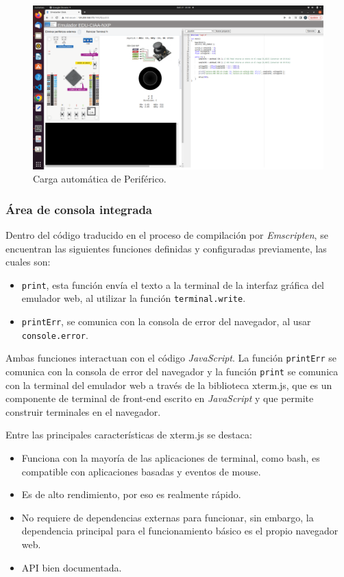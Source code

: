 \begin{figure}[ht]
	\centering
	\includegraphics[scale=.20]{./Figures/cargarPeriferico.png}
	\caption{Carga automática de Periférico. }
	\label{fig:cargarPeriferico}
\end{figure}



\subsubsection{Área de consola integrada}

Dentro del código traducido en el proceso de compilación por \textit{Emscripten}, se encuentran las siguientes funciones definidas y configuradas previamente, las cuales son: 

\begin{itemize}
\item \texttt{print}, esta función envía el texto a la terminal de la interfaz gráfica del emulador web, al utilizar la función \texttt{terminal.write}.
\item \texttt{printErr}, se comunica con la consola de error del navegador, al usar \newline \texttt{console.error}.
\end{itemize}

Ambas funciones interactuan con el código \textit{JavaScript}. La función \texttt{printErr} se comunica con la consola de error del navegador y la función \texttt{print} se comunica con la terminal del emulador web a través de la biblioteca xterm.js, que es un componente de terminal de front-end escrito en \textit{JavaScript} y que permite construir terminales en el navegador. 

Entre las principales características de xterm.js se destaca:

\begin{itemize}
	\item Funciona con la mayoría de las aplicaciones de terminal, como bash, es compatible con aplicaciones basadas y eventos de mouse.
	\item Es de alto rendimiento, por eso es realmente rápido.
	\item No requiere de dependencias externas para funcionar, sin embargo, la dependencia principal para el funcionamiento básico es el propio navegador web.
	\item API bien documentada.
\end{itemize}


